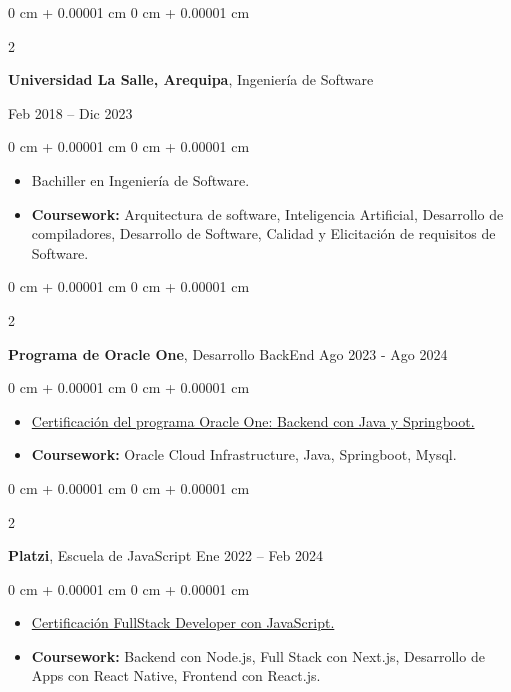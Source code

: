 \documentclass[10pt, letterpaper]{article}
\newenvironment{highlights}{
    \begin{itemize}[
        topsep=0.10 cm,
        parsep=0.10 cm,
        partopsep=0pt,
        itemsep=0pt,
        leftmargin=0 cm + 10pt
    ]
}{
    \end{itemize}
} %
\newenvironment{onecolentry}{
    \begin{adjustwidth}{
        0 cm + 0.00001 cm
    }{
        0 cm + 0.00001 cm
    }
}{
    \end{adjustwidth}
} %
\newenvironment{twocolentry}[2][]{
    \onecolentry
    \def\secondColumn{#2}
    \setcolumnwidth{\fill, 4.5 cm}
    \begin{paracol}{2}
}{
    \switchcolumn \raggedleft \secondColumn
    \end{paracol}
    \endonecolentry
} %
\begin{document}
        \begin{twocolentry}{
            Feb 2018 – Dic 2023
        }
            \textbf{Universidad La Salle, Arequipa}, Ingeniería de Software
        \end{twocolentry}

        \vspace{0.10 cm}
        \begin{onecolentry}
            \begin{highlights}
                \item Bachiller en Ingeniería de Software.
                \item \textbf{Coursework:} Arquitectura de software, Inteligencia Artificial, Desarrollo de compiladores, Desarrollo de Software, Calidad y Elicitación de requisitos de Software. 
            \end{highlights}
        \end{onecolentry}
        \vspace{0.30 cm}

        \begin{twocolentry}{
            Ago 2023 - Ago 2024
        }
            \textbf{Programa de Oracle One}, Desarrollo BackEnd\end{twocolentry}

        \vspace{0.10 cm}
        \begin{onecolentry}
            \begin{highlights}
                \item \href{https://app.aluracursos.com/user/efren609/fullCertificate/124b1c05ec9e67541c81dad40a470321}{Certificación del programa Oracle One: Backend con Java y Springboot.} 
                \item \textbf{Coursework:} Oracle Cloud Infrastructure, Java, Springboot, Mysql.
            \end{highlights}
        \end{onecolentry}
        
        \vspace{0.30 cm}

        \begin{twocolentry}{
            Ene 2022 – Feb 2024
        }
            \textbf{Platzi}, Escuela de JavaScript\end{twocolentry}

        \vspace{0.10 cm}
        \begin{onecolentry}
            \begin{highlights}
                \item \href{https://platzi.com/p/fabriciocendecar/ruta/100-javascript-full-stack/diploma/detalle/}{Certificación FullStack Developer con JavaScript.}
                \item \textbf{Coursework:} Backend con Node.js, Full Stack con Next.js, Desarrollo de Apps con React Native, Frontend con React.js.
            \end{highlights}
        \end{onecolentry}
\end{document}
